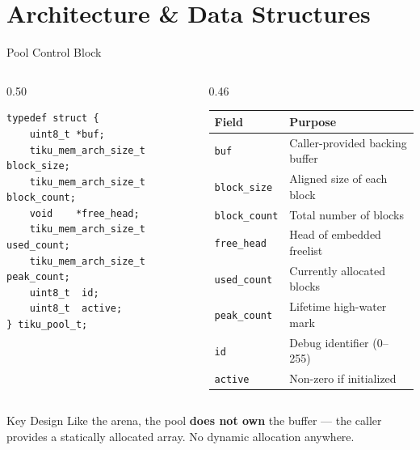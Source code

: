 \documentclass[aspectratio=169, 10pt]{beamer}
\begin{document}
\section{Architecture \& Data Structures}

\begin{frame}[fragile]{Pool Control Block}
\begin{columns}[T]
\begin{column}{0.50\textwidth}
\begin{lstlisting}[style=cstyle, title={kernel/memory/tiku\_mem.h}]
typedef struct {
    uint8_t *buf;
    tiku_mem_arch_size_t block_size;
    tiku_mem_arch_size_t block_count;
    void    *free_head;
    tiku_mem_arch_size_t used_count;
    tiku_mem_arch_size_t peak_count;
    uint8_t  id;
    uint8_t  active;
} tiku_pool_t;
\end{lstlisting}
\end{column}

\begin{column}{0.46\textwidth}
\begin{tabular}{@{}lp{4.5cm}@{}}
\toprule
\textbf{Field} & \textbf{Purpose} \\
\midrule
\texttt{buf}         & Caller-provided backing buffer \\
\texttt{block\_size}  & Aligned size of each block \\
\texttt{block\_count} & Total number of blocks \\
\texttt{free\_head}   & Head of embedded freelist \\
\texttt{used\_count}  & Currently allocated blocks \\
\texttt{peak\_count}  & Lifetime high-water mark \\
\texttt{id}          & Debug identifier (0--255) \\
\texttt{active}      & Non-zero if initialized \\
\bottomrule
\end{tabular}
\end{column}
\end{columns}

\vspace{0.5em}
\begin{block}{Key Design}
Like the arena, the pool \textbf{does not own} the buffer --- the caller
provides a statically allocated array. No dynamic allocation anywhere.
\end{block}
\end{frame}
\end{document}
